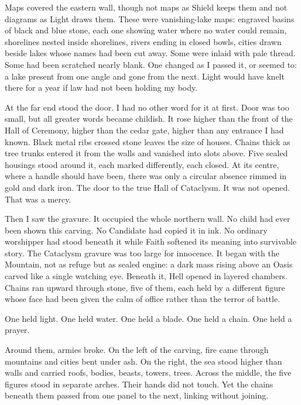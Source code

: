Maps covered the eastern wall, though not maps as Shield keeps them and not diagrams as Light draws them. These were vanishing-lake maps: engraved basins of black and blue stone, each one showing water where no water could remain, shorelines nested inside shorelines, rivers ending in closed bowls, cities drawn beside lakes whose names had been cut away. Some were inlaid with pale thread. Some had been scratched nearly blank. One changed as I passed it, or seemed to: a lake present from one angle and gone from the next. Light would have knelt there for a year if law had not been holding my body.\par

At the far end stood the door. I had no other word for it at first. Door was too small, but all greater words became childish. It rose higher than the front of the Hall of Ceremony, higher than the cedar gate, higher than any entrance I had known. Black metal ribs crossed stone leaves the size of houses. Chains thick as tree trunks entered it from the walls and vanished into slots above. Five sealed housings stood around it, each marked differently, each closed. At its centre, where a handle should have been, there was only a circular absence rimmed in gold and dark iron. The door to the true Hall of Cataclysm. It was not opened. That was a mercy.\par

Then I saw the gravure. It occupied the whole northern wall. No child had ever been shown this carving. No Candidate had copied it in ink. No ordinary worshipper had stood beneath it while Faith softened its meaning into survivable story. The Cataclysm gravure was too large for innocence. It began with the Mountain, not as refuge but as sealed engine: a dark mass rising above an Oasis carved like a single watching eye. Beneath it, Hell opened in layered chambers. Chains ran upward through stone, five of them, each held by a different figure whose face had been given the calm of office rather than the terror of battle.\par

One held light. One held water. One held a blade. One held a chain. One held a prayer.\par

Around them, armies broke. On the left of the carving, fire came through mountains and cities bent under ash. On the right, the sea stood higher than walls and carried roofs, bodies, beasts, towers, trees. Across the middle, the five figures stood in separate arches. Their hands did not touch. Yet the chains beneath them passed from one panel to the next, linking without joining.\par


